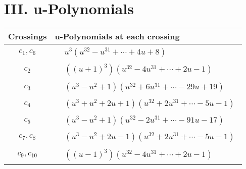\documentclass[1p]{elsarticle_modified}
\theoremstyle{definition}
\begin{document}
\newpage\renewcommand{\arraystretch}{1}
\centering \section*{ III. u-Polynomials}
\begin{tabular}{m{50pt}|m{274pt}}
Crossings & \hspace{64pt}u-Polynomials at each crossing \\
\hline $$\begin{aligned}c_{1},c_{6}\end{aligned}$$&$\begin{aligned}
&u^3(u^{32}- u^{31}+\cdots+4 u+8)
\end{aligned}$\\
\hline $$\begin{aligned}c_{2}\end{aligned}$$&$\begin{aligned}
&((u+1)^3)(u^{32}-4 u^{31}+\cdots+2 u-1)
\end{aligned}$\\
\hline $$\begin{aligned}c_{3}\end{aligned}$$&$\begin{aligned}
&(u^3- u^2+1)(u^{32}+6 u^{31}+\cdots-29 u+19)
\end{aligned}$\\
\hline $$\begin{aligned}c_{4}\end{aligned}$$&$\begin{aligned}
&(u^3+u^2+2 u+1)(u^{32}+2 u^{31}+\cdots-5 u-1)
\end{aligned}$\\
\hline $$\begin{aligned}c_{5}\end{aligned}$$&$\begin{aligned}
&(u^3- u^2+1)(u^{32}-2 u^{31}+\cdots-91 u-17)
\end{aligned}$\\
\hline $$\begin{aligned}c_{7},c_{8}\end{aligned}$$&$\begin{aligned}
&(u^3- u^2+2 u-1)(u^{32}+2 u^{31}+\cdots-5 u-1)
\end{aligned}$\\
\hline $$\begin{aligned}c_{9},c_{10}\end{aligned}$$&$\begin{aligned}
&((u-1)^3)(u^{32}-4 u^{31}+\cdots+2 u-1)
\end{aligned}$\\
\hline
\end{tabular}\newpage\renewcommand{\arraystretch}{1}
\end{document}
